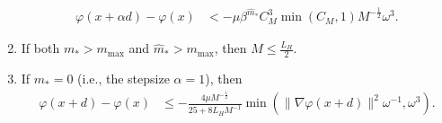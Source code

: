 \begin{lemma}
\begin{enumerate}
    \begin{align}
        \label{eqn:newton-cg-sol-decay-smaller-stepsize}
        \varphi(x + \alpha d) - \varphi(x)
        &< %
    -\mu\beta^{\hat m_*} C_{M}^3 \min\left( C_{M}, 1  \right) M^{-\frac{1}{2}} \omega^3.
    \end{align}
    \item If both $m_* > m_{\mathrm{max}}$ and $\hat m_* > m_{\mathrm{max}}$, then $M \leq \frac{L_H}{2}$.
    \item If $m_* = 0$ (i.e., the stepsize $\alpha = 1$), then
    \begin{align}
        \label{eqn:newton-cg-sol-decay-ls0}
        \varphi(x + d) - \varphi(x)
        &\leq 
        -\frac{4\mu M^{-\frac{1}{2}}}{25 + 8L_HM^{-1}} \min \left( \| \nabla \varphi(x + d) \|^2 \omega^{-1}, \omega^3 \right).
    \end{align}
    \end{enumerate}
\end{lemma}
